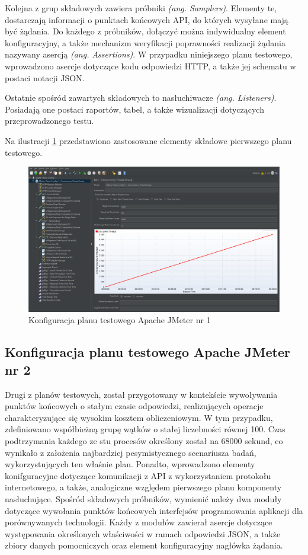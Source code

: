 Kolejna z grup składowych zawiera próbniki \textit{(ang. Samplers)}. Elementy te, dostarczają informacji o punktach końcowych API, do których wysyłane mają być żądania. Do każdego z próbników, dołączyć można indywidualny element konfiguracyjny, a także mechanizm weryfikacji poprawności realizacji żądania nazywany asercją \textit{(ang. Assertions)}. W przypadku niniejszego planu testowego, wprowadzono asercje dotyczące kodu odpowiedzi HTTP, a także jej schematu w postaci notacji JSON.

Ostatnie spośród zawartych składowych to nasłuchiwacze \textit{(ang. Listeners)}. Posiadają one postaci raportów, tabel, a także wizualizacji dotyczących przeprowadzonego testu.

Na ilustracji \ref{fig:test-plan-1} przedstawiono zastosowane elementy składowe pierwszego planu testowego.

\begin{figure}[ht]
    \centering
     \includegraphics[width=\linewidth]{rys04/test-plan-1.png}
    \caption{Konfiguracja planu testowego Apache JMeter nr 1}
    \label{fig:test-plan-1}
\end{figure}

\subsection*{Konfiguracja planu testowego Apache JMeter nr 2}
\label{plan-testowy-2}
Drugi z planów testowych, został przygotowany w kontekście wywoływania punktów końcowych o stałym czasie odpowiedzi, realizujących operacje charakteryzujące się wysokim kosztem obliczeniowym. W tym przypadku, zdefiniowano współbieżną grupę wątków o stałej liczebności równej 100. Czas podtrzymania każdego ze stu procesów określony został na 68000 sekund, co wynikało z założenia najbardziej pesymistycznego scenariusza badań, wykorzystujących ten właśnie plan. Ponadto, wprowadzono elementy konifguracyjne dotyczące komunikacji z API z wykorzystaniem protokołu internetowego, a także, analogiczne względem pierwszego planu komponenty nasłuchujące. Spośród składowych próbników, wymienić należy dwa moduły dotyczące wywołania punktów końcowych interfejsów programowania aplikacji dla porównywanych technologii. Każdy z modułów zawierał asercje dotyczące występowania określonych właściwości w ramach odpowiedzi JSON, a także zbiory danych pomocniczych oraz element konfiguracyjny nagłówka żądania.  

